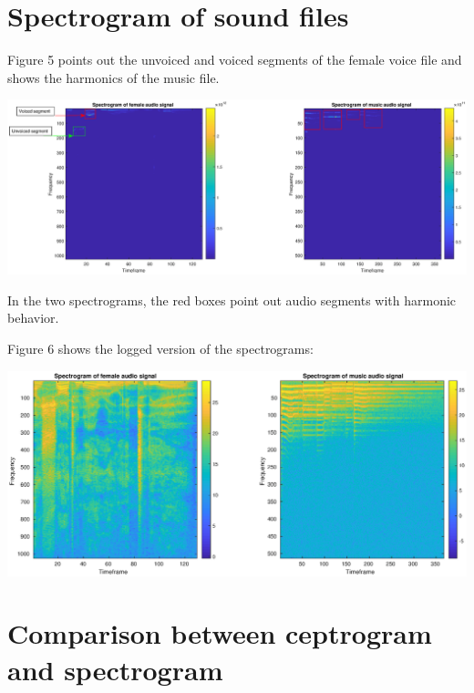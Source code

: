 \documentclass[]{article}
\let\origfigure\figure
\let\endorigfigure\endfigure
\renewenvironment{figure}[1][2] {
    \expandafter\origfigure\expandafter[H]
} {
    \endorigfigure
}
\begin{document}
\newpage

\section{Spectrogram of sound files}\label{spectrogram-of-sound-files}

Figure 5 points out the unvoiced and voiced segments of the female voice
file and shows the harmonics of the music file.

\begin{figure}
\centering
\includegraphics{Result_Pics/female_music_spetgram_marked.eps}
\caption{Annotated spectrogram of audio files}
\end{figure}

In the two spectrograms, the red boxes point out audio segments with
harmonic behavior.

Figure 6 shows the logged version of the spectrograms:

\begin{figure}
\centering
\includegraphics{Result_Pics/female_music_spetgram_log.eps}
\caption{Logged version of the spectrograms for the two audio files}
\end{figure}

\newpage

\section{Comparison between ceptrogram and
spectrogram}\label{comparison-between-ceptrogram-and-spectrogram}
\end{document}
